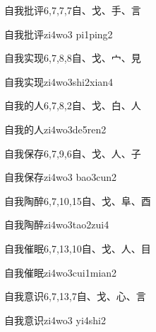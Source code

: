 \begin{Entry}{自我批评}{6,7,7,7}{⾃、⼽、⼿、⾔}
  \begin{Phonetics}{自我批评}{zi4wo3 pi1ping2}
  \end{Phonetics}
\end{Entry}

\begin{Entry}{自我实现}{6,7,8,8}{⾃、⼽、⼧、⾒}
  \begin{Phonetics}{自我实现}{zi4wo3shi2xian4}
  \end{Phonetics}
\end{Entry}

\begin{Entry}{自我的人}{6,7,8,2}{⾃、⼽、⽩、⼈}
  \begin{Phonetics}{自我的人}{zi4wo3de5ren2}
  \end{Phonetics}
\end{Entry}

\begin{Entry}{自我保存}{6,7,9,6}{⾃、⼽、⼈、⼦}
  \begin{Phonetics}{自我保存}{zi4wo3 bao3cun2}
  \end{Phonetics}
\end{Entry}

\begin{Entry}{自我陶醉}{6,7,10,15}{⾃、⼽、⾩、⾣}
  \begin{Phonetics}{自我陶醉}{zi4wo3tao2zui4}
  \end{Phonetics}
\end{Entry}

\begin{Entry}{自我催眠}{6,7,13,10}{⾃、⼽、⼈、⽬}
  \begin{Phonetics}{自我催眠}{zi4wo3cui1mian2}
  \end{Phonetics}
\end{Entry}

\begin{Entry}{自我意识}{6,7,13,7}{⾃、⼽、⼼、⾔}
  \begin{Phonetics}{自我意识}{zi4wo3 yi4shi2}
  \end{Phonetics}
\end{Entry}

